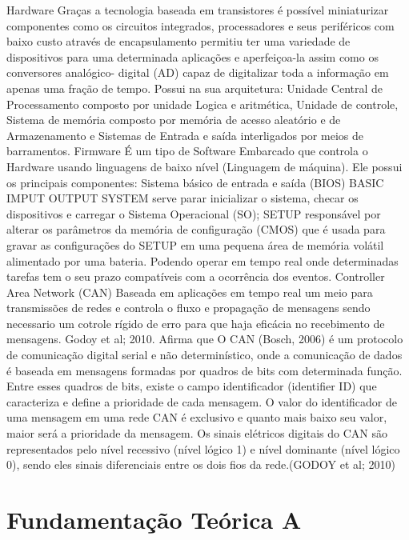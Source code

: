 Hardware 
Graças a tecnologia baseada em transistores é possível miniaturizar componentes como os circuitos integrados, processadores e seus periféricos com baixo custo através de encapsulamento permitiu ter uma variedade de dispositivos para uma determinada aplicações e aperfeiçoa-la assim como os conversores analógico- digital (AD) capaz de digitalizar toda a informação em apenas uma fração de tempo.  Possui na sua arquitetura: Unidade Central de Processamento composto por unidade Logica e aritmética, Unidade de controle, Sistema de memória composto por memória de acesso aleatório e de Armazenamento e Sistemas de Entrada e saída interligados por meios de barramentos.
Firmware
É um tipo de Software Embarcado que controla o Hardware usando linguagens de baixo nível (Linguagem de máquina). Ele possui os principais componentes: Sistema básico de entrada e saída (BIOS) BASIC IMPUT OUTPUT SYSTEM serve parar inicializar o sistema, checar os dispositivos e carregar o Sistema Operacional (SO); SETUP responsável por alterar os parâmetros da memória de configuração (CMOS) que é usada para gravar as configurações do SETUP em uma pequena área de memória volátil alimentado por uma bateria. Podendo operar em tempo real onde determinadas tarefas tem o seu prazo compatíveis com a ocorrência dos eventos.
Controller Area Network (CAN)
Baseada em aplicações em tempo real um meio para transmissões de redes e controla o fluxo e propagação de mensagens sendo necessario um cotrole rígido de erro para que haja eficácia no recebimento de mensagens.
Godoy et al; 2010. Afirma que O CAN (Bosch, 2006) é um protocolo de comunicação digital serial e não determinístico, onde a comunicação de dados é baseada em mensagens formadas por quadros de bits com determinada função. Entre esses quadros de bits, existe o campo identificador (identifier ID) que caracteriza e define a prioridade de cada mensagem. O valor do identificador de uma mensagem em uma rede CAN é exclusivo e quanto mais baixo seu valor, maior será a prioridade da mensagem. Os sinais elétricos digitais do CAN são representados pelo nível recessivo (nível lógico 1) e nível dominante (nível lógico 0), sendo eles sinais diferenciais entre os dois fios da rede.(GODOY et al; 2010)

\label{cap:fundamentacao-teorica}



\section{Fundamentação Teórica A}


